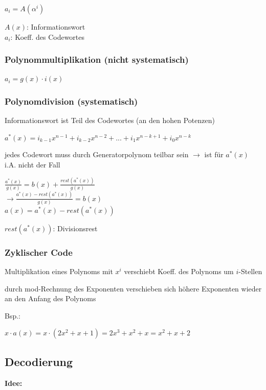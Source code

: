 $\displaystyle{
    a_i = A(\alpha^i)
}$

$A(x)$: Informationswort\\
$a_i$: Koeff. des Codewortes

\subsubsection{Polynommultiplikation (nicht systematisch)}

$\displaystyle{
    a_i = g(x) \cdot i(x)
}$

\subsubsection{Polynomdivision (systematisch)}

Informationswort ist Teil des Codewortes (an den hohen Potenzen)

$\displaystyle{
    a^*(x) = i_{k-1} x^{n-1} + i_{k-2} x^{n-2} + ... + i_1 x^{n-k+1} + i_0 x^{n-k}
}$

jedes Codewort muss durch Generatorpolynom teilbar sein $\rightarrow$ ist
für $a^*(x)$ i.A. nicht der Fall

$\displaystyle{
    \frac{a^*(x)}{g(x)} = b(x) + \frac{rest(a^*(x))}{g(x)}
}$\\
$\displaystyle{
    \rightarrow \frac{a^*(x) - rest\left(a^*(x)\right)}{g(x)} = b(x)
}$\\
$\displaystyle{
    a(x) = a^*(x) - rest\left(a^*(x)\right)
}$

$rest\left(a^*(x)\right)$: Divisionsrest

\subsubsection{Zyklischer Code}

Multiplikation eines Polynoms mit $x^i$ verschiebt Koeff. des Polynoms um $i$-Stellen

durch mod-Rechnung des Exponenten verschieben sich höhere Exponenten wieder an den Anfang des Polynoms

Bsp.:

$\displaystyle{
    x \cdot a(x) = x \cdot ( 2x^2 + x + 1 ) = 2x^3 + x^2 + x = x^2 + x + 2
}$

\subsection{Decodierung}

\textbf{Idee:}

